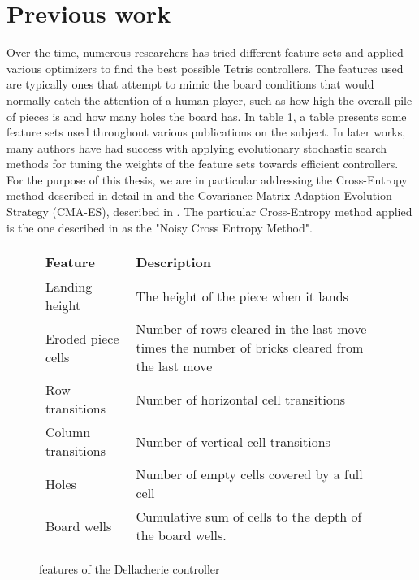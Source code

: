 \section{Previous work}

Over the time, numerous researchers has tried different feature 
sets and applied various optimizers to find the best 
possible Tetris controllers. The features used are typically
ones that attempt to mimic the board conditions that would
normally catch the attention of a human player, such as
how high the overall pile of pieces is and how many holes 
the board has. In \citep{scherrer2009:b} table 1, a table 
presents some feature sets used throughout various publications
on the subject. In later works, many authors have had success
with applying evolutionary stochastic search methods for tuning 
the weights of the feature sets towards
efficient controllers. For the purpose of this thesis,
we are in particular addressing the
Cross-Entropy method described in detail in \citep{cetut2014} and the
Covariance Matrix Adaption Evolution Strategy (CMA-ES), described 
in \citep{hansen2011}. The particular Cross-Entropy method applied 
is the one described in \citep{szita:06} as the "Noisy Cross Entropy Method".\\

\begin{figure}[h!]
\begin{center}
\begin{tabular}{| l | p{8cm} |}
\hline
\textbf{Feature} & \textbf{Description}\\
\hline
Landing height & The height of the piece when it lands\\
\hline
Eroded piece cells & Number of rows cleared in the last move
times the number of bricks cleared from the last move\\
\hline
Row transitions & Number of horizontal cell transitions\\
\hline
Column transitions & Number of vertical cell transitions \\
\hline
Holes & Number of empty cells covered by a full cell\\
\hline
Board wells & Cumulative sum of cells to the depth of
the board wells.\\
\hline
\end{tabular}
\end{center}
\caption{features of the Dellacherie controller \label{table:dellfeat}}
\end{figure}


